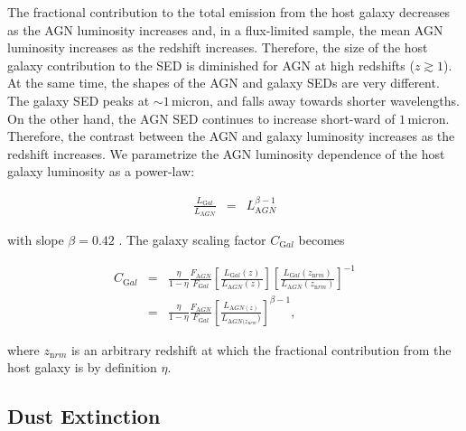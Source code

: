 The fractional contribution to the total emission from the host galaxy decreases as the AGN luminosity increases and, in a flux-limited sample, the mean AGN luminosity increases as the redshift increases.
Therefore, the size of the host galaxy contribution to the SED is diminished for AGN at high redshifts ($z\gtrsim1$). 
At the same time, the shapes of the AGN and galaxy SEDs are very different. 
The galaxy SED peaks at $\sim1$\,micron, and falls away towards shorter wavelengths. 
On the other hand, the AGN SED continues to increase short-ward of $1$\,micron. 
Therefore, the contrast between the AGN and galaxy luminosity increases as the redshift increases. 
We parametrize the AGN luminosity dependence of the host galaxy luminosity as a power-law:

\begin{eqnarray}
  \label{eq:lgal}
  \frac{L_{\mathrm Gal}}{L_{\mathrm AGN}} &=& L_{\mathrm AGN}^{\beta - 1} 
\end{eqnarray}

with slope $\beta=0.42$ \citep{croom04}. 
The galaxy scaling factor $C_{\mathrm Gal}$ becomes 

\begin{eqnarray}
  C_{\mathrm Gal} &=& \frac{\eta}{1 - \eta} \frac{F_{\mathrm AGN}}{F_{\mathrm Gal}} \left[ \frac{ L_{\mathrm Gal}(z)} {L_{\mathrm AGN}(z)} \right] \left[ \frac{ L_{\mathrm Gal}(z_{\mathrm nrm})} {L_{\mathrm AGN}(z_{\mathrm nrm})} \right]^{-1} \\
  &=& \frac{\eta}{1 - \eta} \frac{F_{\mathrm AGN}}{F_{\mathrm Gal}} \left[ \frac{L_{\mathrm AGN(z)}} {L_{\mathrm AGN(z_{\mathrm nrm}})} \right]^{\beta -1}, 
\end{eqnarray}

where $z_{\mathrm nrm}$ is an arbitrary redshift at which the fractional contribution from the host galaxy is by definition $\eta$. 

\subsection{Dust Extinction}
\label{sec:sed-extinction} 


